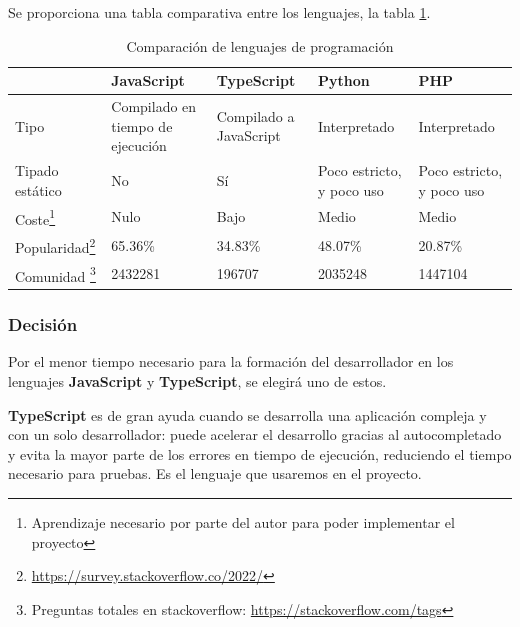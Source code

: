 Se proporciona una tabla comparativa entre los lenguajes, la tabla \ref{tab:comparacionLenguajes}.

\begin{table}
\begin{minipage}{\textwidth}
\begin{tabularx}{\textwidth}{|l|X|X|X|X|}
\hline
   & JavaScript                       & TypeScript             & Python                    & PHP                       \\
\hline
Tipo                                                & Compilado en tiempo de ejecución & Compilado a JavaScript & Interpretado              & Interpretado              \\
\hline
Tipado estático                                     & No                               & Sí                     & Poco estricto, y poco uso & Poco estricto, y poco uso \\
\hline
Coste\footnote{Aprendizaje necesario por parte del autor para poder implementar el proyecto}                                & Nulo                             & Bajo                   & Medio                     & Medio                     \\
\hline
Popularidad\footnote{\url{https://survey.stackoverflow.co/2022/}} & 65.36\%                          & 34.83\%                & 48.07\%                   & 20.87\%                   \\
\hline
Comunidad \footnote{Preguntas totales en stackoverflow: \url{https://stackoverflow.com/tags}}      & 2432281                          & 196707                 & 2035248                   & 1447104               \\
\hline
\end{tabularx}
\end{minipage}
\caption{Comparación de lenguajes de programación}\label{tab:comparacionLenguajes}
\end{table}

\subsubsection{Decisión}

Por el menor tiempo necesario para la formación del desarrollador en los lenguajes \textbf{JavaScript} y \textbf{TypeScript}, se elegirá uno de estos.

\textbf{TypeScript} es de gran ayuda cuando se desarrolla una aplicación compleja y con un solo desarrollador: puede acelerar el desarrollo gracias al autocompletado y evita la mayor parte de los errores en tiempo de ejecución, reduciendo el tiempo necesario para pruebas. Es el lenguaje que usaremos en el proyecto.

